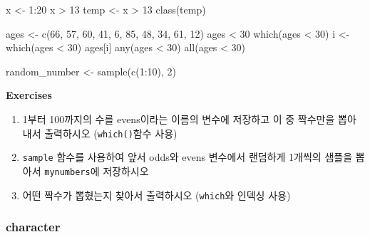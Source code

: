 \documentclass[
  a4paper,
]{book}
\newenvironment{Shaded}{\begin{snugshade}}{\end{snugshade}}
\newcommand{\DecValTok}[1]{\textcolor[rgb]{0.68,0.00,0.00}{#1}}
\newcommand{\FunctionTok}[1]{\textcolor[rgb]{0.28,0.35,0.67}{#1}}
\newcommand{\NormalTok}[1]{\textcolor[rgb]{0.00,0.23,0.31}{#1}}
\newcommand{\OtherTok}[1]{\textcolor[rgb]{0.00,0.23,0.31}{#1}}
\newcommand{\SpecialCharTok}[1]{\textcolor[rgb]{0.37,0.37,0.37}{#1}}
\begin{document}
\begin{Shaded}
\begin{Highlighting}[]
\NormalTok{x }\OtherTok{\textless{}{-}} \DecValTok{1}\SpecialCharTok{:}\DecValTok{20}
\NormalTok{x }\SpecialCharTok{\textgreater{}} \DecValTok{13}
\NormalTok{temp }\OtherTok{\textless{}{-}}\NormalTok{ x }\SpecialCharTok{\textgreater{}} \DecValTok{13}
\FunctionTok{class}\NormalTok{(temp)}

\NormalTok{ages }\OtherTok{\textless{}{-}} \FunctionTok{c}\NormalTok{(}\DecValTok{66}\NormalTok{, }\DecValTok{57}\NormalTok{, }\DecValTok{60}\NormalTok{, }\DecValTok{41}\NormalTok{,  }\DecValTok{6}\NormalTok{, }\DecValTok{85}\NormalTok{, }\DecValTok{48}\NormalTok{, }\DecValTok{34}\NormalTok{, }\DecValTok{61}\NormalTok{, }\DecValTok{12}\NormalTok{)}
\NormalTok{ages }\SpecialCharTok{\textless{}} \DecValTok{30}
\FunctionTok{which}\NormalTok{(ages }\SpecialCharTok{\textless{}} \DecValTok{30}\NormalTok{)}
\NormalTok{i }\OtherTok{\textless{}{-}} \FunctionTok{which}\NormalTok{(ages }\SpecialCharTok{\textless{}} \DecValTok{30}\NormalTok{)}
\NormalTok{ages[i]}
\FunctionTok{any}\NormalTok{(ages }\SpecialCharTok{\textless{}} \DecValTok{30}\NormalTok{)}
\FunctionTok{all}\NormalTok{(ages }\SpecialCharTok{\textless{}} \DecValTok{30}\NormalTok{)}

\NormalTok{random\_number }\OtherTok{\textless{}{-}} \FunctionTok{sample}\NormalTok{(}\FunctionTok{c}\NormalTok{(}\DecValTok{1}\SpecialCharTok{:}\DecValTok{10}\NormalTok{), }\DecValTok{2}\NormalTok{)}
\end{Highlighting}
\end{Shaded}

\textbf{Exercises}

\begin{enumerate}
\def\labelenumi{\arabic{enumi})}
\item
  1부터 100까지의 수를 evens이라는 이름의 변수에 저장하고 이 중 짝수만을
  뽑아내서 출력하시오 (\texttt{which()}함수 사용)
\item
  \texttt{sample} 함수를 사용하여 앞서 odds와 evens 변수에서 랜덤하게
  1개씩의 샘플을 뽑아서 \texttt{mynumbers}에 저장하시오
\item
  어떤 짝수가 뽑혔는지 찾아서 출력하시오 (\texttt{which}와 인덱싱 사용)
\end{enumerate}

\hypertarget{character}{%
\subsubsection{character}\label{character}}
\end{document}
